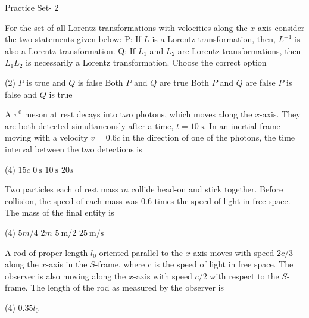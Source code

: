 \newpage
\begin{abox}
	Practice Set- 2
	\end{abox}
\begin{enumerate}
	\item For the set of all Lorentz transformations with velocities along the $x$-axis consider the two statements given below:
	P: If $L$ is a Lorentz transformation, then, $L^{-1}$ is also a Lorentz transformation.
	Q: If $L_{1}$ and $L_{2}$ are Lorentz transformations, then $L_{1} L_{2}$ is necessarily a Lorentz transformation.
	Choose the correct option
{	}
\begin{tasks}(2)
	\task[\textbf{A.}] $P$ is true and $Q$ is false
	\task[\textbf{B.}]Both $P$ and $Q$ are true
	\task[\textbf{C.}]Both $P$ and $Q$ are false
	\task[\textbf{D.}]$P$ is false and $Q$ is true
\end{tasks}
	\item A $\pi^{0}$ meson at rest decays into two photons, which moves along the $x$-axis. They are both detected simultaneously after a time, $t=10 \mathrm{~s} .$ In an inertial frame moving with a velocity $v=0.6 c$ in the direction of one of the photons, the time interval between the two detections is
	{}
\begin{tasks}(4)
	\task[\textbf{A.}] $15 c$
	\task[\textbf{B.}]$0 \mathrm{~s}$
	\task[\textbf{C.}] $10 \mathrm{~s}$
	\task[\textbf{D.}]$20 s$
\end{tasks}	
\begin{minipage}{\textwidth}
	\item Two particles each of rest mass $m$ collide head-on and stick together. Before collision, the speed of each mass was $0.6$ times the speed of light in free space. The mass of the final entity is
\end{minipage}
\begin{tasks}(4)
	\task[\textbf{A.}] $5 m / 4$
	\task[\textbf{B.}]$2 m$
	\task[\textbf{C.}]$5 \mathrm{~m} / 2$
	\task[\textbf{D.}]$25 \mathrm{~m} / \mathrm{s}$
\end{tasks}
	\item A rod of proper length $l_{0}$ oriented parallel to the $x$-axis moves with speed $2 c / 3$ along the $x$-axis in the $S$-frame, where $c$ is the speed of light in free space. The observer is also moving along the $x$-axis with speed $c / 2$ with respect to the $S$-frame. The length of the rod as measured by the observer is
	{}
\begin{tasks}(4)
	\task[\textbf{A.}] $0.35 l_{0}$

\end{tasks}
\end{enumerate}
